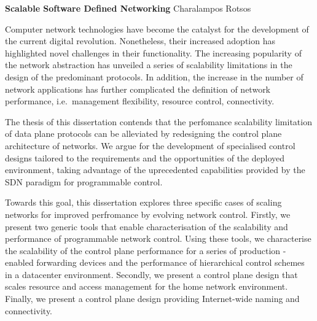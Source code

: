 



\begin{center}
    {\LARGE\textbf{Scalable Software Defined Networking}} \newline \newline
    {\large Charalampos Rotsos}
    \end{center}

Computer network technologies have become the catalyst for the development of
the current digital revolution. Nonetheless, their increased adoption has
highlighted novel challenges in their functionality. The increasing popularity
of the network abstraction has unveiled a series of scalability limitations in
the design of the predominant protocols. In addition, the increase in the number
of network applications has further complicated the definition of network
performance, i.e.~management flexibility, resource control, connectivity. 

The thesis of this dissertation contends that the perfomance scalability
limitation of data plane protocols can be alleviated by redesigning the control
plane architecture of networks. We argue for the development of specialised
control designs tailored to the requirements and the opportunities of the
deployed environment, taking advantage of the uprecedented capabilities provided
by the SDN paradigm for programmable control. 

Towards this goal, this dissertation explores three specific cases of scaling
networks for improved perfromance by evolving network control. Firstly, we
present two generic tools that enable characterisation of the scalability and
performance of programmable network control. Using these tools, we characterise
the scalability of the control plane performance for a series of production
\of-enabled forwarding devices and the performance of hierarchical control
schemes in a datacenter environment. Secondly, we present a control plane design
that scales resource and access management for the home network environment.
Finally, we present a control plane design providing Internet-wide naming and
connectivity. 







